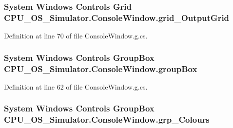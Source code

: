 \subsubsection[{grid\+\_\+\+Output\+Grid}]{\setlength{\rightskip}{0pt plus 5cm}System Windows Controls Grid C\+P\+U\+\_\+\+O\+S\+\_\+\+Simulator.\+Console\+Window.\+grid\+\_\+\+Output\+Grid\hspace{0.3cm}{\ttfamily [package]}}\label{class_c_p_u___o_s___simulator_1_1_console_window_afef6d481c8b608672b98da16721143b0}


Definition at line 70 of file Console\+Window.\+g.\+cs.

\hypertarget{class_c_p_u___o_s___simulator_1_1_console_window_ad2d026ec9701c1b7c36dc5038927f1ab}{}
\subsubsection[{group\+Box}]{\setlength{\rightskip}{0pt plus 5cm}System Windows Controls Group\+Box C\+P\+U\+\_\+\+O\+S\+\_\+\+Simulator.\+Console\+Window.\+group\+Box\hspace{0.3cm}{\ttfamily [package]}}\label{class_c_p_u___o_s___simulator_1_1_console_window_ad2d026ec9701c1b7c36dc5038927f1ab}


Definition at line 62 of file Console\+Window.\+g.\+cs.

\hypertarget{class_c_p_u___o_s___simulator_1_1_console_window_aefc749577a14756234b1a73c0a4a6f50}{}
\subsubsection[{grp\+\_\+\+Colours}]{\setlength{\rightskip}{0pt plus 5cm}System Windows Controls Group\+Box C\+P\+U\+\_\+\+O\+S\+\_\+\+Simulator.\+Console\+Window.\+grp\+\_\+\+Colours\hspace{0.3cm}{\ttfamily [package]}}\label{class_c_p_u___o_s___simulator_1_1_console_window_aefc749577a14756234b1a73c0a4a6f50}


